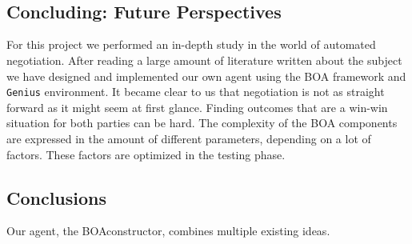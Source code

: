  \\ 

 \\

\subsection{Concluding: Future Perspectives}

For this project we performed an in-depth study in the world of automated negotiation. After reading a large amount of literature written about the subject we have designed and implemented our own agent using the BOA framework and \texttt{Genius} environment. It became clear to us that negotiation is not as straight forward as it might seem at first glance. Finding outcomes that are a win-win situation for both parties can be hard. The complexity of the BOA components are expressed in the amount of different parameters, depending on a lot of factors. These factors are optimized in the testing phase.  \\








\subsection{Conclusions}

Our agent, the BOAconstructor, combines multiple existing ideas.


